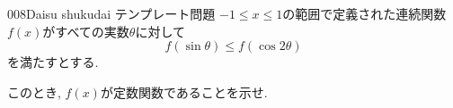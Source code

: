 \begin{prob}{008}{}{Daisu shukudai テンプレート問題}
$-1\leq x\leq 1$の範囲で定義された連続関数$f(x)$がすべての実数$\theta$に対して
\[ f(\sin{\theta}) \leq f(\cos{2\theta}) \]
を満たすとする.

このとき,  $f(x)$が定数関数であることを示せ.
\end{prob}
